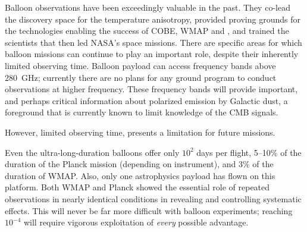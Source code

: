 \documentclass[PICOReport.tex]{subfiles}
\begin{document}

Balloon observations have been exceedingly valuable in the past. They co-lead the discovery space for the temperature anisotropy, provided proving grounds for the technologies enabling the success of COBE, WMAP and \planck , and trained the scientists that then led NASA's space missions. There are specific areas for which balloon missions can continue to play an important role, despite their inherently limited observing time. Balloon payload can access frequency bands above 280~GHz; currently there are no plans for any ground program to conduct observations at higher frequency. These frequency bands will provide important, and perhaps critical information about polarized emission by  Galactic dust, a foreground that is currently known to limit knowledge of the CMB signals.  

 However, limited observing time, presents a limitation for future missions. 

Even the ultra-long-duration balloons offer only $10^2$ days per flight, 5--10\% of the duration of the Planck mission (depending on instrument), and 3\% of the duration of WMAP. Also, only one astrophysics payload has flown on this platform.  Both WMAP and Planck showed the essential role of repeated observations in nearly identical conditions in revealing and controlling systematic effects.  This will never be far more difficult with balloon experiments; reaching $10^{-4}$ will require vigorous exploitation of {\it every\/} possible advantage.
\end{document}
